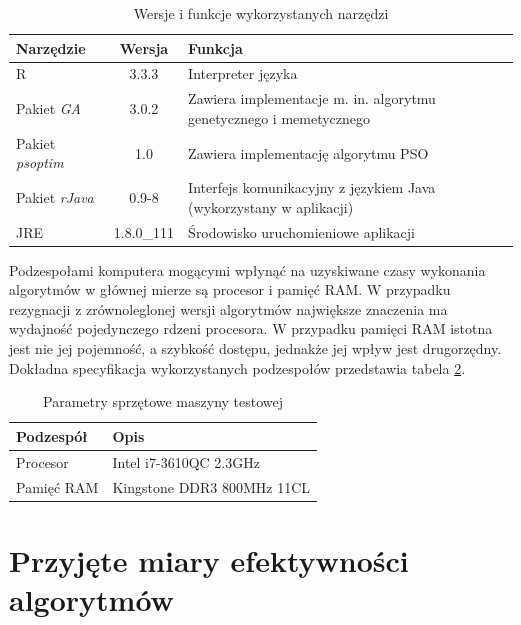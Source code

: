 \begin{table}[hb]
\label{tab:wykorzystane_narzedzia}
\caption{Wersje i funkcje wykorzystanych narzędzi}
\begin{tabularx}{\textwidth}{|l|c|X|}
	\hline
	Narzędzie & Wersja & Funkcja \\
	\hline
	R & 3.3.3 & Interpreter języka \\
	Pakiet \emph{GA} & 3.0.2 & Zawiera implementacje m. in. algorytmu genetycznego i memetycznego \\
	Pakiet \emph{psoptim} & 1.0 & Zawiera implementację algorytmu PSO \\
	Pakiet \emph{rJava} & 0.9-8 & Interfejs komunikacyjny z językiem Java (wykorzystany w aplikacji) \\
	JRE & 1.8.0\_111 & Środowisko uruchomieniowe aplikacji \\
	\hline
	\end{tabularx}
\end{table}
\par
Podzespołami komputera mogącymi wpłynąć na uzyskiwane czasy wykonania algorytmów w głównej mierze są procesor i pamięć RAM. W przypadku rezygnacji z zrównoleglonej wersji algorytmów największe znaczenia ma wydajność pojedynczego rdzeni procesora. W przypadku pamięci RAM istotna jest nie jej pojemność, a szybkość dostępu, jednakże jej wpływ jest drugorzędny. Dokładna specyfikacja wykorzystanych podzespołów przedstawia tabela \ref{table:parametry_komputera}.
\begin{table}[hb]
\caption{Parametry sprzętowe maszyny testowej}
\label{table:parametry_komputera}
\begin{center}
\begin{tabular}{|l|l|}
	\hline
	Podzespół & Opis \\
	\hline
	Procesor & Intel i7-3610QC 2.3GHz \\
	Pamięć RAM & Kingstone DDR3 800MHz 11CL \\
	\hline
	\end{tabular}
\end{center}
\end{table}



\section{Przyjęte miary efektywności algorytmów}
\label{sec:przyjete_miary_efektywnosci_algorytmow}

